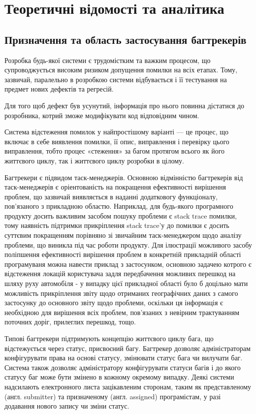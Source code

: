 \documentclass[../main.tex]{subfiles}
\begin{document}
\chapter{Теоретичні відомості та аналітика}

\section{Призначення та область застосування багтрекерів}

Розробка будь-якої системи є трудомістким та важким процесом, що супроводжується високим ризиком допущення помилки на всіх етапах. Тому, зазвичай, паралельно в розробкою системи відбувається і її тестування на предмет нових дефектів та регресій.

Для того щоб дефект був усунутий, інформація про нього повинна дістатися до розробника, котрий зможе модифікувати код відповідним чином.

Система відстеження помилок у найпростішому варіанті — це процес, що включає в себе виявлення помилки, її опис, виправлення і перевірку цього виправлення, тобто процес «стеження» за багом протягом всього як його життєвого циклу, так і життєвого циклу розробки в цілому.\cite{bugtracking_systems}

Багтрекери є підвидом таск-менеджерів. Основною відмінністю багтрекерів від таск-менеджерів є  оріентованість на покращення ефективності вирішення проблем, що зазвичай виявляється в наданні додатковогу функціоналу, пов'язаного з прикладною областю. Наприклад, для будь-якого програмного продукту досить важливим засобом пошуку проблеми є stack trace помилки, тому наявність підтримки прикріплення stack trace'у до помилки є досить суттєвим покращенням порівняно зі звичайним таск-менеджером щодо аналізу проблеми, що виникла під час роботи продукту. Для ілюстрації можливого засобу поліпшення ефективності вирішення проблем в конкретній прикладній області програмуваня можна навести приклад з застосунком, основною задачею котрого є відстеження локацій користувача задля передбачення можливих перешкод на шляху руху автомобіля - у випадку цієї прикладної області було б доцільно мати можливість прикріплення звіту щодо отриманих географічних даних з самого застосунку до основного звіту щодо проблеми, оскільки ця інформація є необхідною для вирішення всіх проблем, пов'язаних з невірним трактуванням поточних доріг, прилеглих перешкод, тощо.

Типові багтрекери підтримують концепцію життєвого циклу бага, що відстежується через статус, присвоєний багу. Багтрекер дозволяє адміністраторам конфігурувати права на основі статусу, змінювати статус бага чи вилучати баг. Система також дозволяє адміністратору конфігурувати статуси багів і до якого статусу баг може бути змінено в кожному окремому випадку. Деякі системи надсилають електронного листа зацікавленим сторонам, таким як представленому (англ. submitter) та призначеному (англ. assigned) програмістам, у разі додавання нового запису чи зміни статус.
\end{document}
